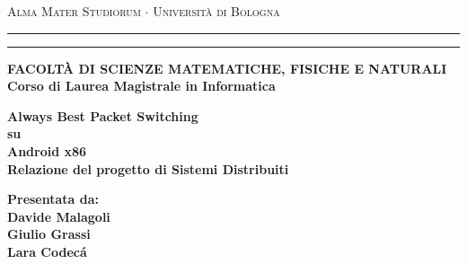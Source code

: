 %
\begin{titlepage}
\begin{center}
{{\Large{\textsc{Alma Mater Studiorum $\cdot$ Universit\`a di
Bologna}}}} \rule[0.1cm]{15.8cm}{0.1mm}
\rule[0.5cm]{15.8cm}{0.6mm}
{\small{\bf FACOLT\`A DI SCIENZE MATEMATICHE, FISICHE E NATURALI\\
Corso di Laurea Magistrale in Informatica}}
\end{center}
\vspace{15mm}
\begin{center}
{\LARGE{\bf Always Best Packet Switching}}\\
\vspace{3mm}
{\LARGE{\bf su}}\\
\vspace{3mm}
{\LARGE{\bf Android x86}}\\
\vspace{19mm} {\large{\bf Relazione del progetto di Sistemi Distribuiti}}
\end{center}
\vspace{40mm}
\par
\noindent
\hfill
\begin{minipage}[t]{0.47\textwidth}\raggedleft
{\large{\bf Presentata da:\\
Davide Malagoli\\
Giulio Grassi\\
Lara Codec\'a}}
\end{minipage}
\vspace{20mm}
\begin{center}
\end{center}
\end{titlepage}
%
